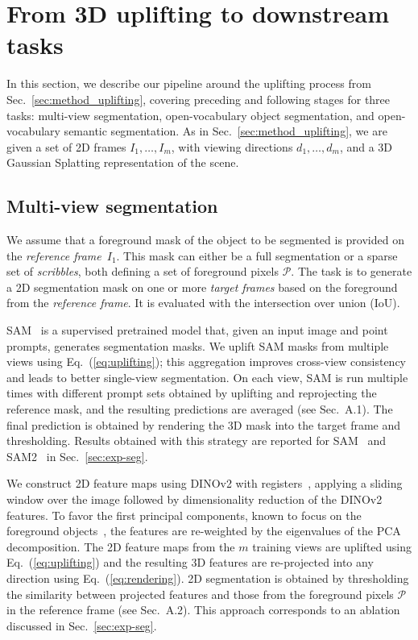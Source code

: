 \section{From 3D uplifting to downstream tasks}

In this section, we describe our pipeline around the uplifting process from Sec.~\ref{sec:method_uplifting}, covering preceding and following stages for three tasks: multi-view segmentation, open-vocabulary object segmentation, and open-vocabulary semantic segmentation. 
As in Sec.~\ref{sec:method_uplifting}, we are given a set of 2D frames $I_1, \dots, I_m$, with viewing directions $d_1, \dots, d_m$, and a 3D Gaussian Splatting representation of the scene.

\subsection{Multi-view segmentation}\label{sec:muti_seg}
\label{sec:method_seg}
We assume that a foreground mask of the object to be segmented is provided on the \emph{reference frame}~$I_1$.
This mask can either be a full segmentation or a sparse set of \emph{scribbles}, both defining a set of foreground pixels $\mathcal{P}$.
The task is to generate a 2D segmentation mask on one or more \emph{target frames} based on the foreground from the \emph{reference frame}. It is evaluated with the intersection over union (IoU). 

SAM~\citep{kirillov2023sam, ravi2024sam2} is a supervised pretrained model that, given an input image and point prompts, generates segmentation masks. 
We uplift SAM masks from multiple views using Eq.~(\ref{eq:uplifting}); this aggregation improves cross-view consistency and leads to better single-view segmentation. On each view, SAM is run multiple times with different prompt sets obtained by uplifting and reprojecting the reference mask, and the resulting predictions are averaged (see Sec.~A.1).
The final prediction is obtained by rendering the 3D mask into the target frame and thresholding.
Results obtained with this strategy are reported for SAM~\citep{kirillov2023sam} and SAM2~\citep{ravi2024sam2} in Sec.~\ref{sec:exp-seg}. 

We construct 2D feature maps using DINOv2 with registers~\citep{darcet2024registers}, applying a sliding window over the image followed by dimensionality reduction of the DINOv2 features.
To favor the first principal components, known to focus on the foreground objects~\citep{oquab2024dinov2}, the features are re-weighted by the eigenvalues of the PCA decomposition.
The 2D feature maps from the $m$ training views are uplifted using Eq.~(\ref{eq:uplifting}) and the resulting 3D features are re-projected into any direction using Eq.~(\ref{eq:rendering}).
2D segmentation is obtained by thresholding the similarity between projected features and those from the foreground pixels $\mathcal{P}$ in the reference frame (see Sec.~A.2).
This approach corresponds to an ablation discussed in Sec.~\ref{sec:exp-seg}.
%

